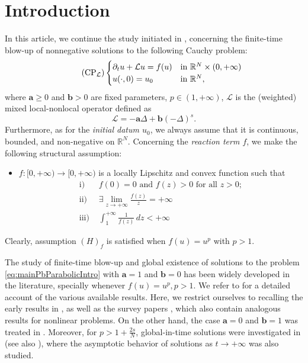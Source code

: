 \documentclass[11pt,a4paper,reqno]{amsart}
\def \LL {\mathcal{L}}
\theoremstyle{definition}
\theoremstyle{plain}
\numberwithin{equation}{section}
\begin{document}
 \maketitle

\section{Introduction}\label{sec.Intro}
In this article, we continue the study initiated in \cite{BPV},
concerning the finite-time blow-up of nonnegative solutions to the
following Cauchy problem:
\begin{equation}\tag{$\mathrm{CP}_{\LL}$}\label{eq:mainPbParabolicIntro}
	\begin{cases}
	\partial_t u+\mathcal{L}	u = f(u) & \text{in $\mathbb{R}^N\times(0,+\infty)$} \\
	u(\cdot,0) = u_0 & \text{in $\mathbb{R}^N$},
	\end{cases}
\end{equation}
where $\mathbf{a} \geq 0$ and $\mathbf{b}>0$ are fixed parameters, $p\in(1,+\infty)$, 
$\mathcal{L}$ is the (weighted) mixed local-nonlocal operator defined as
$$\mathcal{L} = -\mathbf{a}\Delta + \mathbf{b}(-\Delta)^s.$$
Furthermore, as for the \emph{initial datum $u_0$}, we always assume that it is continuous, bounded, and non-negative on $\mathbb{R}^N$. Concerning the \emph{reaction term $f$},
we make the following structural assumption:
\begin{itemize}
	\item[$(H)_f$] $f:[0,+\infty)\to[0,+\infty)$ is a locally Lipschitz
	and
	convex function such that
	\begin{align*}
	\mathrm{i)}\,\,&\text{$f(0) = 0$ and $f(z) > 0$ for all $z > 0$}; \\
	\mathrm{ii)}\,\,& \exists\lim_{z\to+\infty}\frac{f(z)}{z} = +\infty\\
	\mathrm{iii)}\,\,&\int_1^{+\infty}\frac{1}{f(z)}\,dz < +\infty	
	\end{align*}
\end{itemize}
Clearly, assumption $(H)_f$ is satisfied when $f(u)=u^p$ with 
$p>1$.



\medskip

The study of finite-time blow-up and global existence of solutions to
the problem \eqref{eq:mainPbParabolicIntro} with $\mathbf{a}=1$ and $\mathbf{b}=0$ has been widely developed in the literature, specially whenever $f(u)=u^p, p>1$.
We refer to \cite{BPV} for a detailed account of the various available
results. Here, we restrict ourselves to recalling the early results
in \cite{F, H, KST}, as well as the survey papers
 \cite{BB, DL, deP, Levine, Mitidieri2, QS}, which also contain analogous
results for nonlinear problems.  On the other hand, the case $\mathbf{a}=0$ and $\mathbf{b}=1$ was treated
in \cite{Sug, LaisterS}.  Moreover, for $p>1+\frac{2s}{N}$, global-in-time solutions were
investigated in \cite{IKK} (see also \cite{HKN}), where the
asymptotic behavior of solutions as $t\to+\infty$ was also studied.
\end{document}
